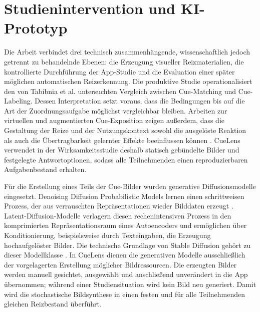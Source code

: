 
\section{Studienintervention und KI-Prototyp}

Die Arbeit verbindet drei technisch zusammenhängende, wissenschaftlich jedoch getrennt zu behandelnde Ebenen: die Erzeugung visueller Reizmaterialien, die kontrollierte Durchführung der App-Studie und die Evaluation einer später möglichen automatischen Reizerkennung. Die produktive Studie operationalisiert den von Tabibnia et al. untersuchten Vergleich zwischen Cue-Matching und Cue-Labeling. Dessen Interpretation setzt voraus, dass die Bedingungen bis auf die Art der Zuordnungsaufgabe möglichst vergleichbar bleiben. Arbeiten zur virtuellen und augmentierten Cue-Exposition zeigen außerdem, dass die Gestaltung der Reize und der Nutzungskontext sowohl die ausgelöste Reaktion als auch die Übertragbarkeit gelernter Effekte beeinflussen können \cite{tabibnia_cuelabeling_2026,pericot_valverde_vr_smoking_cessation_2019,dougan_ar_smoking_cessation_2025}. CueLens verwendet in der Wirksamkeitsstudie deshalb statisch gebündelte Bilder und festgelegte Antwortoptionen, sodass alle Teilnehmenden einen reproduzierbaren Aufgabenbestand erhalten.

Für die Erstellung eines Teils der Cue-Bilder wurden generative Diffusionsmodelle eingesetzt. Denoising Diffusion Probabilistic Models lernen einen schrittweisen Prozess, der aus verrauschten Repräsentationen wieder Bilddaten erzeugt \cite{ho_diffusion_2020}. Latent-Diffusion-Modelle verlagern diesen rechenintensiven Prozess in den komprimierten Repräsentationsraum eines Autoencoders und ermöglichen über Konditionierung, beispielsweise durch Texteingaben, die Erzeugung hochaufgelöster Bilder. Die technische Grundlage von Stable Diffusion gehört zu dieser Modellklasse \cite{rombach_latent_diffusion_2022}. In CueLens dienen die generativen Modelle ausschließlich der vorgelagerten Erstellung möglicher Bildressourcen. Die erzeugten Bilder werden manuell gesichtet, ausgewählt und anschließend unverändert in die App übernommen; während einer Studiensituation wird kein Bild neu generiert. Damit wird die stochastische Bildsynthese in einen festen und für alle Teilnehmenden gleichen Reizbestand überführt.

